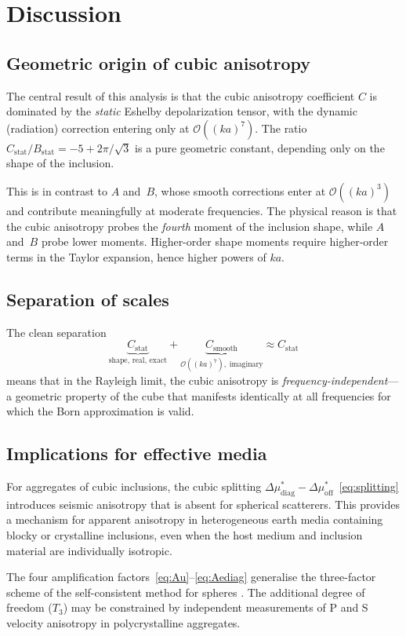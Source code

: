 \documentclass[11pt,a4paper]{article}
\newcommand{\order}[1]{\mathcal{O}\!\left(#1\right)}
\newcommand{\Dmu}{\Delta\mu}
\begin{document}
\section{Discussion}
\label{sec:discussion}

\subsection{Geometric origin of cubic anisotropy}

The central result of this analysis is that the cubic anisotropy
coefficient $C$ is dominated by the \emph{static} Eshelby
depolarization tensor, with the dynamic (radiation) correction
entering only at $\order{(ka)^7}$. The ratio
$C_\text{stat}/B_\text{stat} = -5 + 2\pi/\sqrt{3}$ is a pure
geometric constant, depending only on the shape of the inclusion.

This is in contrast to $A$ and~$B$, whose smooth corrections
enter at $\order{(ka)^3}$ and contribute meaningfully at moderate
frequencies. The physical reason is that the cubic anisotropy
probes the \emph{fourth} moment of the inclusion shape, while
$A$ and~$B$ probe lower moments. Higher-order shape moments
require higher-order terms in the Taylor expansion, hence higher
powers of $ka$.

\subsection{Separation of scales}

The clean separation
\begin{equation*}
  \underbrace{C_\text{stat}}_{\text{shape, real, exact}}
  + \underbrace{C_\text{smooth}}_{\order{(ka)^7},\;\text{imaginary}}
  \approx C_\text{stat}
\end{equation*}
means that in the Rayleigh limit, the cubic anisotropy
is \emph{frequency-independent}---a geometric property of the
cube that manifests identically at all frequencies for which the
Born approximation is valid.

\subsection{Implications for effective media}

For aggregates of cubic inclusions, the cubic splitting
$\Dmu_\text{diag}^* - \Dmu_\text{off}^*$~\eqref{eq:splitting}
introduces seismic anisotropy that is absent for spherical
scatterers. This provides a mechanism for apparent anisotropy in
heterogeneous earth media containing blocky or crystalline
inclusions, even when the host medium and inclusion material
are individually isotropic.

The four amplification factors~\eqref{eq:Au}--\eqref{eq:Aediag}
generalise the three-factor scheme of the self-consistent method
for spheres \citep{Korringa1973,Willis1981}. The additional degree
of freedom ($T_3$) may be constrained by independent measurements
of P and S velocity anisotropy in polycrystalline aggregates.

\bigskip


\end{document}
